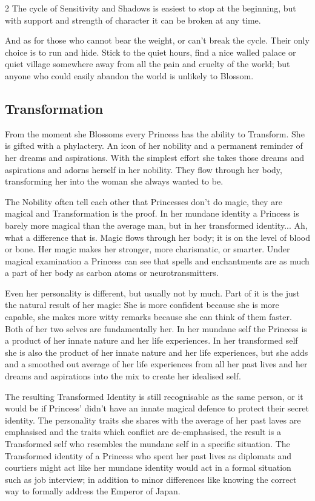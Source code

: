 \begin{multicols}{2}
The cycle of Sensitivity and Shadows is easiest to stop at the beginning, but with support and strength of character it can be broken at any time. 

And as for those who cannot bear the weight, or can't break the cycle. Their only choice is to run and hide. Stick to the quiet hours, find a nice walled palace or quiet village somewhere away from all the pain and cruelty of the world; but anyone who could easily abandon the world is unlikely to Blossom. 

\subsection*{Transformation}

From the moment she Blossoms every Princess has the ability to Transform. She is gifted with a phylactery. An icon of her nobility and a permanent reminder of her dreams and aspirations. With the simplest effort she takes those dreams and aspirations and adorns herself in her nobility. They flow through her body, transforming her into the woman she always wanted to be.  

The Nobility often tell each other that Princesses don't do magic, they are magical and Transformation is the proof. In her mundane identity a Princess is barely more magical than the average man, but in her transformed identity... Ah, what a difference that is. Magic flows through her body; it is on the level of blood or bone. Her magic makes her stronger, more charismatic, or smarter. Under magical examination a Princess can see that spells and enchantments are as much a part of her body as carbon atoms or neurotransmitters. 

Even her personality is different, but usually not by much. Part of it is the just the natural result of her magic: She is more confident because she is more capable, she makes more witty remarks because she can think of them faster. Both of her two selves are fundamentally her. In her mundane self the Princess is a product of her innate nature and her life experiences. In her transformed self she is also the product of her innate nature and her life experiences, but she adds and a smoothed out average of her life experiences from all her past lives and her dreams and aspirations into the mix to create her idealised self. 

The resulting Transformed Identity is still recognisable as the same person, or it would be if Princess' didn't have an innate magical defence to protect their secret identity. The personality traits she shares with the average of her past laves are emphasised and the traits which conflict are de-emphasised, the result is a Transformed self who resembles the mundane self in a specific situation. The Transformed identity of a Princess who spent her past lives as diplomats and courtiers might act like her mundane identity would act in a formal situation such as job interview; in addition to minor differences like knowing the correct way to formally address the Emperor of Japan. 


\end{multicols}
